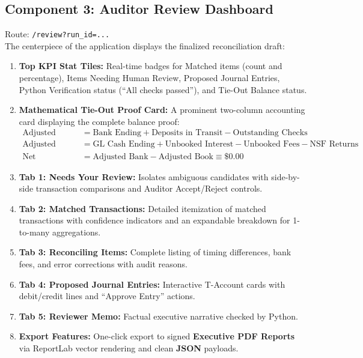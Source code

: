 \documentclass[10pt,a4paper]{article}
\begin{document}
\subsection{Component 3: Auditor Review Dashboard}
Route: \texttt{/review?run\_id=...} \\
The centerpiece of the application displays the finalized reconciliation draft:
\begin{enumerate}
    \item \textbf{Top KPI Stat Tiles:} Real-time badges for Matched items (count and percentage), Items Needing Human Review, Proposed Journal Entries, Python Verification status (``All checks passed''), and Tie-Out Balance status.
    \item \textbf{Mathematical Tie-Out Proof Card:} A prominent two-column accounting card displaying the complete balance proof:
    \begin{align}
        \text{Adjusted Bank} &= \text{Bank Ending} + \text{Deposits in Transit} - \text{Outstanding Checks} \\
        \text{Adjusted Book} &= \text{GL Cash Ending} + \text{Unbooked Interest} - \text{Unbooked Fees} - \text{NSF Returns} \\
        \text{Net Discrepancy} &= \text{Adjusted Bank} - \text{Adjusted Book} \equiv \$0.00
    \end{align}
    \item \textbf{Tab 1: Needs Your Review:} Isolates ambiguous candidates with side-by-side transaction comparisons and Auditor Accept/Reject controls.
    \item \textbf{Tab 2: Matched Transactions:} Detailed itemization of matched transactions with confidence indicators and an expandable breakdown for 1-to-many aggregations.
    \item \textbf{Tab 3: Reconciling Items:} Complete listing of timing differences, bank fees, and error corrections with audit reasons.
    \item \textbf{Tab 4: Proposed Journal Entries:} Interactive T-Account cards with debit/credit lines and ``Approve Entry'' actions.
    \item \textbf{Tab 5: Reviewer Memo:} Factual executive narrative checked by Python.
    \item \textbf{Export Features:} One-click export to signed \textbf{Executive PDF Reports} via ReportLab vector rendering and clean \textbf{JSON} payloads.
\end{enumerate}
\end{document}
